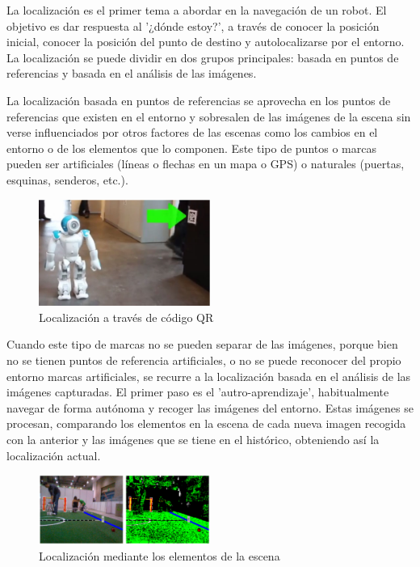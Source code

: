 La localización es el primer tema a abordar en la navegación de un robot. El
objetivo es dar respuesta al '¿dónde estoy?', a través de conocer la posición
inicial, conocer la posición del punto de destino y autolocalizarse por el
entorno. La localización se puede dividir en dos grupos principales: basada en
puntos de referencias y basada en el análisis de las imágenes.

La localización basada en puntos de referencias se aprovecha en los puntos de
referencias que existen en el entorno y sobresalen de las imágenes de la escena
sin verse influenciados por otros factores de las escenas como los cambios en el
entorno o de los elementos que lo componen. Este tipo de puntos o marcas pueden
ser artificiales (líneas o flechas en un mapa o GPS) o naturales (puertas,
esquinas, senderos, etc.).

\begin{figure}[!th]
  \begin{center}
    \includegraphics[width=0.5\textwidth]{images/cap2/LocalizacionMarcas.eps}
    \caption{Localización a través de código QR}
    \label{fig:LocalizacionMarcas}
  \end{center}
\end{figure}

Cuando este tipo de marcas no se pueden separar de las imágenes, porque bien no
se tienen puntos de referencia artificiales, o no se puede reconocer del propio
entorno marcas artificiales, se recurre a la localización basada en el análisis
de las imágenes capturadas. El primer paso es el 'autro-aprendizaje',
habitualmente navegar de forma autónoma y recoger las imágenes del entorno.
Estas imágenes se procesan, comparando los elementos en la escena de cada nueva
imagen recogida con la anterior y las imágenes que se tiene en el histórico,
obteniendo así la localización actual.

\begin{figure}[!th]
  \begin{center}
    \includegraphics[width=0.5\textwidth]{images/cap2/LocalizacionImagenes.eps}
    \caption{Localización mediante los elementos de la escena}
    \label{fig:LocalizacionImagenes}
  \end{center}
\end{figure}


